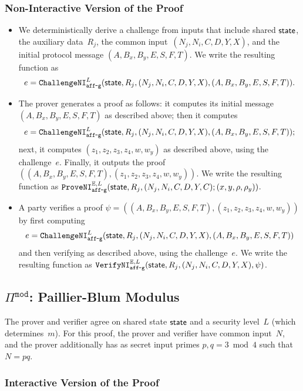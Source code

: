 \documentclass[11pt]{article}
\def\state{{\sf state}}
\newcommand{\proof}[1]{\ensuremath{\Pi^{\mathtt{#1}}}}
\newcommand{\challengeni}[1]{\ensuremath{\mathtt{ChallengeNI}_{\mathtt{#1}}}}
\newcommand{\proveni}[1]{\ensuremath{\mathtt{ProveNI}_{\mathtt{#1}}}}
\newcommand{\verifyni}[1]{\ensuremath{\mathtt{VerifyNI}_{\mathtt{#1}}}}
\newcommand{\E}{\mathbb{E}}
\newcommand{\?}[1]{\stackrel{?}{#1}}
\begin{document}
\subsubsection{Non-Interactive Version of the Proof}
\begin{itemize}
    \item We deterministically derive a challenge from inputs that include shared $\state$, the auxiliary data~$R_j$, the common input~$(N_j,N_i,C,D,Y,X)$, and the initial protocol message $(A,B_x,B_y,E,S,F,T)$.    
We write the resulting function as \[e = \challengeni{aff\mbox{-}g}^{L}(\state,R_j,(N_j,N_i,C,D,Y,X),(A,B_x,B_y,E,S,F,T)).\]

    \item The prover generates a proof as follows: it computes its initial message $(A,B_x,B_y,E,S,F,T)$ as described above; then it computes \[e = \challengeni{aff\mbox{-}g}^{L}(\state,R_j,(N_j,N_i,C,D,Y,X),(A,B_x,B_y,E,S,F,T));\] next, it computes $(z_1,z_2,z_3,z_4,w,w_y)$ as described above, using the challenge~$e$. Finally, it outputs the proof $((A,B_x,B_y,E,S,F,T), (z_1,z_2,z_3,z_4,w,w_y))$. We write the resulting function as $\proveni{aff\mbox{-}g}^{\E,L}(\state, R_j, (N_j, N_i, C, D, Y, C); (x,y,\rho,\rho_y))$. 
  
    \item A party verifies a proof $\psi=((A,B_x,B_y,E,S,F,T), (z_1,z_2,z_3,z_4,w,w_y))$ by first computing 
    \[e = \challengeni{aff\mbox{-}g}^{L}(\state,R_j,(N_j,N_i,C,D,Y,X),(A,B_x,B_y,E,S,F,T))\]
    and then verifying as described above, using the challenge~$e$. We write the resulting function as $\verifyni{aff\mbox{-}g}^{\E,L}(\state,R_j, (N_j,N_i,C,D,Y,X), \psi)$.
\end{itemize}

\subsection{$\proof{mod}$: Paillier-Blum Modulus}
The prover and verifier agree on shared state $\state$ and a security level~$L$ (which determines~$m$). For this proof, the prover and verifier have common input~$N$, and the prover additionally has as secret input primes $p, q=3 \bmod 4$ such that~$N=pq$.

\subsubsection{Interactive Version of the Proof}
\end{document}
